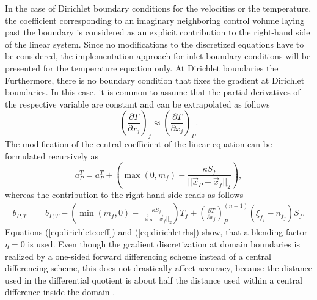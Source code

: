 In the case of Dirichlet boundary conditions for the velocities or the temperature, the coefficient corresponding to an imaginary neighboring control volume laying past the boundary is considered as an explicit contribution to the right-hand side of the linear system. Since no modifications to the discretized equations have to be considered, the implementation approach for inlet boundary conditions will be presented for the temperature equation only. At Dirichlet boundaries the Furthermore, there is no boundary condition that fixes the gradient at Dirichlet boundaries. In this case, it is common to assume that the partial derivatives of the respective variable are constant and can be extrapolated as follows
\begin{displaymath}
  \left( \frac{\partial T}{\partial x_j} \right)_f \approx \left( \frac{\partial T}{\partial x_j} \right)_P.
\end{displaymath}
The modification of the central coefficient of the linear equation can be formulated recursively as
\begin{equation}
  \label{eq:dirichletcoeff}
  a_P^{T} = a_P^{T} + \left( \max(0,\dot{m}_f )  - \frac{\kappa S_f}{|| \vec{x}_P - \vec{x}_f ||_2} \right),
\end{equation}
whereas the contribution to the right-hand side reads as follows
\begin{align}
  \label{eq:dirichletrhs}
  b_{P,T} &= b_{P,T} - \left( \min(\dot{m}_f,0) - \frac{\kappa S_f}{||\vec{x}_P - \vec{x}_f||_2}\right) T_f +
  \left( \frac{\partial T}{\partial x_j}\right)_P^{(n-1)} \left(\xi_{f_j} - n_{f_j}\right)S_f.
\end{align}
Equations (\ref{eq:dirichletcoeff}) and (\ref{eq:dirichletrhs}) show, that a blending factor \(\eta = 0\) is used. Even though the gradient discretization at domain boundaries is realized by a one-sided forward differencing scheme instead of a central differencing scheme, this does not drastically affect accuracy, because the distance used in the differential quotient is about half the distance used within a central difference inside the domain \cite{schaefer99}.

